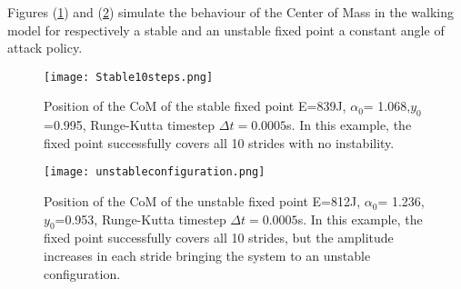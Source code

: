 Figures (\ref{estavel}) and (\ref{unstable}) simulate the behaviour of the Center of Mass in the walking model for respectively a stable and an unstable fixed point a constant angle of attack policy.
\begin{figure}[H]
  \centering
  \texttt{[image: Stable10steps.png]}
  \caption{Position of the CoM of the stable fixed point E=839J, $\alpha_0$= 1.068,$y_0$=0.995, Runge-Kutta timestep $\Delta t=0.0005$s. In this example, the fixed point successfully covers all 10 strides with no instability. }
  \label{estavel}
\end{figure}


\begin{figure}[H]
  \centering
  \texttt{[image: unstableconfiguration.png]}
  \caption{Position of the CoM of the unstable fixed point E=812J, $\alpha_0$= 1.236,$y_0$=0.953, Runge-Kutta timestep $\Delta t=0.0005$s. In this example, the fixed point successfully covers all 10 strides, but the amplitude increases in each stride bringing the system to an unstable configuration. }
  \label{unstable}
\end{figure}




